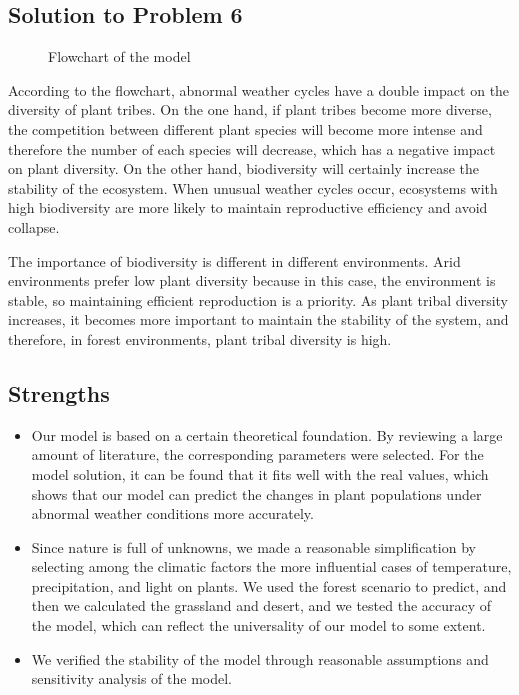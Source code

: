 \documentclass[12pt]{article}
\begin{document}
\subsection{Solution to Problem 6}

\begin{figure}[htb]
	\centering
	
	\caption{Flowchart of the model}
	\label{fig:flowchart}
\end{figure}

According to the flowchart, abnormal weather cycles have a double impact on the diversity of plant tribes. On the one hand, if plant tribes become more diverse, the competition between different plant species will become more intense and therefore the number of each species will decrease, which has a negative impact on plant diversity. On the other hand, biodiversity will certainly increase the stability of the ecosystem. When unusual weather cycles occur, ecosystems with high biodiversity are more likely to maintain reproductive efficiency and avoid collapse.

The importance of biodiversity is different in different environments. Arid environments prefer low plant diversity because in this case, the environment is stable, so maintaining efficient reproduction is a priority. As plant tribal diversity increases, it becomes more important to maintain the stability of the system, and therefore, in forest environments, plant tribal diversity is high.

\subsection{Strengths}

\begin{itemize}
	\item Our model is based on a certain theoretical foundation. By reviewing a large amount of literature, the corresponding parameters were selected. For the model solution, it can be found that it fits well with the real values, which shows that our model can predict the changes in plant populations under abnormal weather conditions more accurately.
	\item Since nature is full of unknowns, we made a reasonable simplification by selecting among the climatic factors the more influential cases of temperature, precipitation, and light on plants. We used the forest scenario to predict, and then we calculated the grassland and desert, and we tested the accuracy of the model, which can reflect the universality of our model to some extent.
	\item We verified the stability of the model through reasonable assumptions and sensitivity analysis of the model.
\end{itemize}
\end{document}
